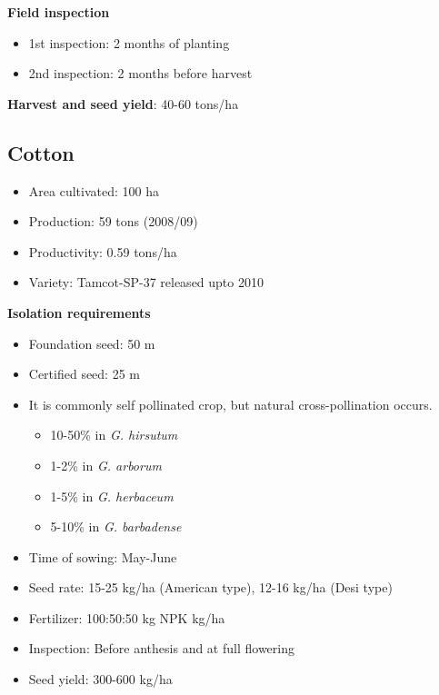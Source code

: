 \documentclass[
  openany]{book}
\providecommand{\tightlist}{%
  \setlength{\itemsep}{0pt}\setlength{\parskip}{0pt}}
\begin{document}
\textbf{Field inspection}

\begin{itemize}
\tightlist
\item
  1st inspection: 2 months of planting
\item
  2nd inspection: 2 months before harvest
\end{itemize}

\textbf{Harvest and seed yield}: 40-60 tons/ha

\hypertarget{cotton}{%
\subsection{Cotton}\label{cotton}}

\begin{itemize}
\tightlist
\item
  Area cultivated: 100 ha
\item
  Production: 59 tons (2008/09)
\item
  Productivity: 0.59 tons/ha
\item
  Variety: Tamcot-SP-37 released upto 2010
\end{itemize}

\textbf{Isolation requirements}

\begin{itemize}
\tightlist
\item
  Foundation seed: 50 m
\item
  Certified seed: 25 m
\item
  It is commonly self pollinated crop, but natural cross-pollination occurs.

  \begin{itemize}
  \tightlist
  \item
    10-50\% in \emph{G. hirsutum}
  \item
    1-2\% in \emph{G. arborum}
  \item
    1-5\% in \emph{G. herbaceum}
  \item
    5-10\% in \emph{G. barbadense}
  \end{itemize}
\item
  Time of sowing: May-June
\item
  Seed rate: 15-25 kg/ha (American type), 12-16 kg/ha (Desi type)
\item
  Fertilizer: 100:50:50 kg NPK kg/ha
\item
  Inspection: Before anthesis and at full flowering
\item
  Seed yield: 300-600 kg/ha
\end{itemize}
\end{document}
